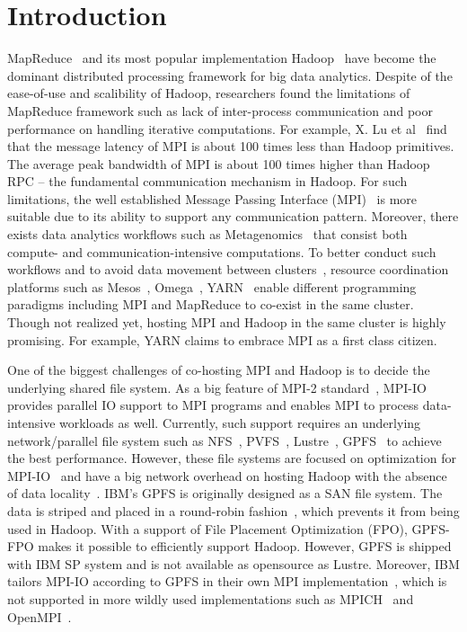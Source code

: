\section{Introduction}
MapReduce~\cite{mr} and its most popular implementation Hadoop~\cite{hadoop}
have become the dominant distributed processing framework for big data
analytics. Despite of the ease-of-use and scalibility of Hadoop, researchers
found the limitations of MapReduce framework such as lack of inter-process
communication and poor performance on handling iterative computations.  For
example, X. Lu et al~\cite{xlu} find that the message latency of MPI is about
100 times less than Hadoop primitives. The average peak bandwidth of MPI is
about 100 times higher than Hadoop RPC -- the fundamental communication
mechanism in Hadoop.  For such limitations, the well established Message Passing
Interface (MPI)~\cite{mpi2012} is more suitable due to its ability to support
any communication pattern. 
 Moreover, there exists data analytics workflows such as
Metagenomics~\cite{meta} that consist both compute- and communication-intensive
computations. To better conduct such workflows and to avoid data
movement between clusters~\cite{catch}, resource coordination platforms such as
Mesos~\cite{mesos}, Omega~\cite{omega}, YARN~\cite{yarn2013} enable different
programming paradigms including MPI and MapReduce to co-exist in the same
cluster. Though not realized yet, hosting MPI and Hadoop in the same cluster is
highly promising. For example, YARN claims to embrace MPI as a first class citizen.

One of the biggest challenges of co-hosting MPI and Hadoop is to decide the
underlying shared file system. As a big feature of MPI-2 standard~\cite{mpi2012},
MPI-IO provides parallel IO support to MPI programs and enables MPI to process
data-intensive workloads as well. Currently, such support requires an underlying
network/parallel file system such as NFS~\cite{nfs1}, PVFS~\cite{pvfs},
Lustre~\cite{lustre}, GPFS~\cite{gpfs} to achieve the best performance. However,
these file systems are focused on optimization for MPI-IO~\cite{mpipvfs,
mpilustre1, mpigpfs} and have a big network overhead on hosting Hadoop with the
absence of data locality~\cite{hadooplustre}. IBM's GPFS is originally designed
as a SAN file system. The data is striped and placed in a round-robin
fashion~\cite{gpfs}, which prevents it from being used in Hadoop. With a support
of File Placement Optimization (FPO), GPFS-FPO makes it possible to efficiently
support Hadoop.  However, GPFS is shipped with IBM SP system and is not
available as opensource as Lustre. Moreover, IBM tailors MPI-IO according to
GPFS in their own MPI implementation~\cite{mpigpfs}, which is not supported in
more wildly used implementations such as MPICH~\cite{mpich} and
OpenMPI~\cite{openmpi}.


